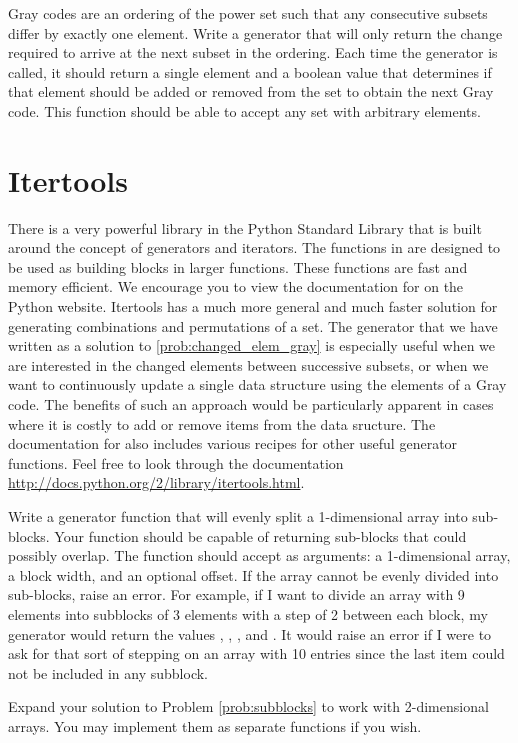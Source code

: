 \begin{problem}
\label{prob:changed_elem_gray}
Gray codes are an ordering of the power set such that any consecutive subsets differ by exactly one element.  Write a generator that will only return the change required to arrive at the next subset in the ordering.  Each time the generator is called, 
it should return a single element and a boolean value that determines if that element should be
added or removed from the set to obtain the next Gray code.  This function should be able to accept any set with arbitrary elements.
\end{problem}

\section*{Itertools}
There is a very powerful library in the Python Standard Library that is built around the concept
of generators and iterators.  The functions in  are designed to be used as
building blocks in larger functions.  These functions are fast and memory efficient.
We encourage you to view the documentation for  on the Python website.  Itertools has a much more general and much faster solution for generating combinations and permutations of a set.
The generator that we have written as a solution to \ref{prob:changed_elem_gray} is especially useful when we are interested in the changed elements between successive subsets, or when we want to continuously update a single data structure using the elements of a Gray code.
The benefits of such an approach would be particularly apparent in cases where it is costly to add or remove items from the data sructure.
The documentation for  also includes various recipes for other useful generator functions.
Feel free to look through the documentation \url{http://docs.python.org/2/library/itertools.html}.

\begin{problem}
\label{prob:subblocks}
Write a generator function that will evenly split a 1-dimensional array into sub-blocks.
Your function should be capable of returning sub-blocks that could possibly overlap.
The function should accept as arguments: a 1-dimensional array, a block width, and an optional offset.
If the array cannot be evenly divided into sub-blocks, raise an error.
For example, if I want to divide an array with 9 elements into subblocks of 3 elements with a step of 2 between each block, my generator would return the values , , , and .
It would raise an error if I were to ask for that sort of stepping on an array with 10 entries since the last item could not be included in any subblock.
\end{problem}

\begin{problem}
Expand your solution to Problem \ref{prob:subblocks} to work with 2-dimensional
arrays.  You may implement them as separate functions if you wish.
\end{problem}

\printbibliography

